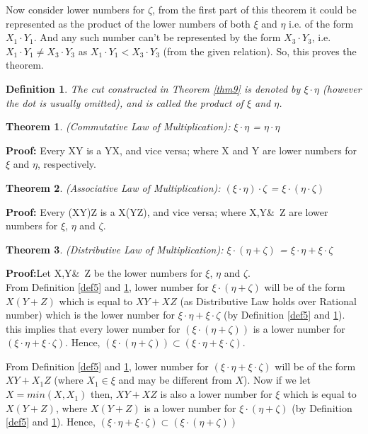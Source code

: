 \documentclass[12pt,a4paper,final,titlepage]{article}
\newtheorem{dfn}{Definition}
\newtheorem{thm}{Theorem}
\begin{document}
Now consider lower numbers for $\zeta$, from the first part of this theorem it could be represented as the product of the lower numbers of both $\xi$ and $\eta$ i.e. of the form $X_1\cdot Y_1$. And any such number can't be represented by the form $X_3\cdot Y_3$, i.e. $X_1\cdot Y_1 \neq X_3\cdot Y_3$ as $X_1\cdot Y_1 < X_3\cdot Y_3$ (from the given relation).
So, this proves the theorem.
\bigskip

\begin{dfn}\label{def6}
The cut constructed in Theorem \ref{thm9} is denoted by $\xi\cdot \eta$ (however the dot is usually omitted), and is called the product of $\xi$ and $\eta$.
\end{dfn}
\begin{thm} (Commutative Law of Multiplication):
$\xi\cdot \eta$ = $\eta\cdot \eta$
\end{thm}
\textbf{Proof:} Every XY is a YX, and vice versa; where X and Y are lower numbers for $\xi$ and $\eta$, respectively.

\begin{thm} (Associative Law of Multiplication):
$(\xi\cdot \eta)\cdot \zeta$ = $\xi\cdot (\eta\cdot \zeta)$
\end{thm}
\textbf{Proof:} Every (XY)Z is a X(YZ), and vice versa; where X,Y\&\ Z are lower numbers for $\xi$, $\eta$ and $\zeta$.

\begin{thm} (Distributive Law of Multiplication):
$\xi\cdot (\eta+\zeta)$ = $\xi\cdot \eta + \xi\cdot \zeta$
\end{thm}
\textbf{Proof:}Let X,Y\&\ Z be the lower numbers for $\xi$, $\eta$ and $\zeta$.\\
From Definition \ref{def5} and \ref{def6}, lower number for $\xi\cdot (\eta+\zeta)$ will be of the form $X(Y+Z)$ which is equal to $XY + XZ$ (as Distributive Law holds over Rational number) which is the lower number for $\xi\cdot \eta + \xi\cdot \zeta$ (by Definition \ref{def5} and \ref{def6}). this implies that every lower number for $(\xi\cdot(\eta+\zeta))$ is a lower number for $(\xi\cdot \eta + \xi\cdot \zeta)$. Hence, $(\xi\cdot (\eta+\zeta)) \subset (\xi\cdot \eta + \xi\cdot \zeta)$.


From Definition \ref{def5} and \ref{def6}, lower number for $(\xi\cdot \eta + \xi\cdot \zeta)$ will be of the form $XY+X_1Z$ (where $X_1\in \xi$ and may be different from $X$). Now if we let $X=min(X,X_1)$ then, $XY+XZ$ is also a lower number for $\xi$ which is equal to $X(Y+Z)$, where $X(Y+Z)$ is a lower number for $\xi\cdot(\eta+\zeta)$ (by Definition \ref{def5} and \ref{def6}). Hence, $(\xi\cdot \eta+\xi\cdot \zeta) \subset (\xi\cdot(\eta+\zeta))$
\end{document}
